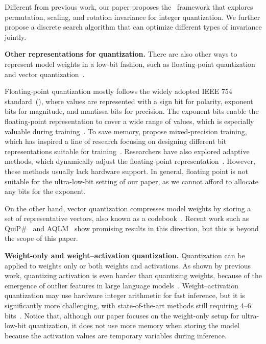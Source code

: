 Different from previous work, our paper proposes the  \method\ framework that explores permutation, scaling, and rotation invariance for integer quantization. We further propose a discrete search algorithm that can optimize different types of invariance jointly. 

\textbf{Other representations for quantization.} There are also other ways to represent model weights in a low-bit fashion, such as floating-point quantization~\citep{10.1145/103162.103163,micikevicius2018mixed} and vector quantization~\citep{1162229,gong2015compressing}.

Floating-point quantization mostly follows the widely adopted IEEE 754 standard~(\citeyear{4610935}), where values are represented with a sign bit for polarity, exponent bits for magnitude, and mantissa bits for precision.
The exponent bits enable the floating-point representation to cover a wide range of values, which is especially valuable during training~\citep{NEURIPS2018_335d3d1c}.
To save memory, \citet{micikevicius2018mixed} propose mixed-precision training, which has inspired a line of research focusing on designing different bit representations suitable for training~\citep{NEURIPS2018_335d3d1c,NEURIPS2019_65fc9fb4,NEURIPS2020_13b91943}.
Researchers have also explored adaptive methods, which dynamically adjust the floating-point representation~\citep{NIPS2017_a0160709,Liu_2021_ICCV}. However, these methods usually lack hardware support.
In general, floating point is not suitable for the ultra-low-bit setting of our paper, as we cannot afford to allocate any bits for the exponent.

On the other hand, vector quantization compresses model weights by storing a set of representative vectors, also known as a codebook~\citep{gong2015compressing,han2016deepcompression}.
Recent work such as QuiP\#~\citep{quipsharp} and AQLM~\citep{aqlm} show promising results in this direction, but this is beyond the scope of this paper.

\textbf{Weight-only and weight--activation quantization.}
Quantization can be applied to weights only or both weights and activations.
As shown by previous work, quantizing activation is even harder than quantizing weights, because of the emergence of outlier features in large language models~\citep{NEURIPS2022_c3ba4962,smoothquant}. Weight--activation quantization may use hardware integer arithmetic for fast inference, but it is significantly more challenging, with state-of-the-art methods still requiring 4--6 bits~\citep{wei-etal-2023-outlier,yuan2023rptq,omniquant}. Notice that, although our paper focuses on the weight-only setup for ultra-low-bit quantization, it does not use more memory when storing the model because the activation values are temporary variables during inference.